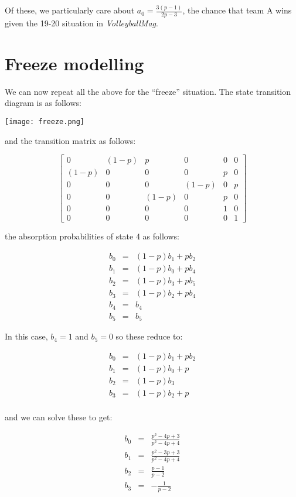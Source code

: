 \documentclass[a4paper,12pt]{article}
\begin{document}
Of these, we particularly care about $a_0 = \frac{3 \left(p - 1\right)}{2 p -
3}$, the chance that team A wins given the 19-20 situation in
\textit{VolleyballMag}.

\section{Freeze modelling}

We can now repeat all the above for the ``freeze'' situation. The state
transition diagram is as follows:

\texttt{[image: freeze.png]}

and the transition matrix as follows:

$$
\begin{bmatrix}
  0 & (1-p) & p & 0 & 0 & 0 \\
  (1-p) & 0 & 0 & 0 & p & 0 \\
  0 & 0 & 0 & (1-p) & 0 & p \\
  0 & 0 & (1-p) & 0 & p & 0 \\
  0 & 0 & 0 & 0 & 1 & 0 \\
  0 & 0 & 0 & 0 & 0 & 1
\end{bmatrix}
$$

the absorption probabilities of state 4 as follows:

\begin{eqnarray*}
  b_0 & = & (1-p)b_1 + pb_2 \\
  b_1 & = & (1-p)b_0 + pb_4 \\
  b_2 & = & (1-p)b_3 + pb_5 \\
  b_3 & = & (1-p)b_2 + pb_4 \\
  b_4 & = & b_4 \\
  b_5 & = & b_5
\end{eqnarray*}

In this case, $b_4 = 1$ and $b_5 = 0$ so these reduce to:

\begin{eqnarray*}
  b_0 & = & (1-p)b_1 + pb_2 \\
  b_1 & = & (1-p)b_0 + p \\
  b_2 & = & (1-p)b_3 \\
  b_3 & = & (1-p)b_2 + p \\
\end{eqnarray*}

and we can solve these to get:

\begin{eqnarray*}
  b_0 & = & \frac{p^{2} - 4 p + 3}{p^{2} - 4 p + 4} \\
  b_1 & = & \frac{p^{2} - 3 p + 3}{p^{2} - 4 p + 4} \\
  b_2 & = & \frac{p - 1}{p - 2} \\
  b_3 & = & - \frac{1}{p - 2}
\end{eqnarray*}
\end{document}
